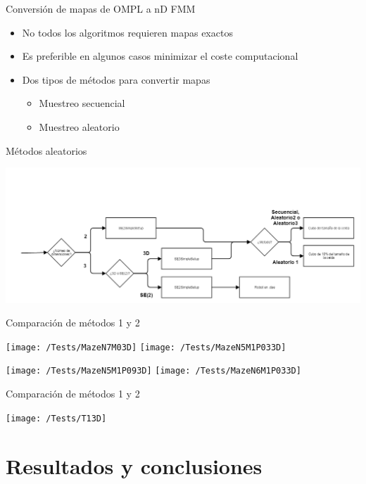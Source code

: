 \documentclass[10pt]{beamer}
\begin{document}
\begin{frame}{Conversión de mapas de OMPL a nD FMM}
	\begin{itemize}
		\item No todos los algoritmos requieren mapas exactos
		\item Es preferible en algunos casos minimizar el coste computacional
		
		\vspace{0.5cm}
		\item Dos tipos de métodos para convertir mapas
			\begin{itemize}
				\item Muestreo secuencial
				\item Muestreo aleatorio
			\end{itemize}
		
	\end{itemize}
\end{frame}

\begin{frame}{Métodos aleatorios}
\begin{center}
\includegraphics[width=\textwidth,height=0.8\textheight,keepaspectratio]{seleccion}	
\end{center}
\end{frame}

\begin{frame}{Comparación de métodos 1 y 2}
\begin{center}
\texttt{[image: /Tests/MazeN7M03D]}
\texttt{[image: /Tests/MazeN5M1P033D]}

\texttt{[image: /Tests/MazeN5M1P093D]}
\texttt{[image: /Tests/MazeN6M1P033D]}
\end{center}
\end{frame}

\begin{frame}{Comparación de métodos 1 y 2}
\vfill
\begin{center}
\texttt{[image: /Tests/T13D]}
\end{center}
\end{frame}

\section{Resultados y conclusiones}

{\aauwavesbg
	\begin{frame}
	\end{frame}}
\end{document}
